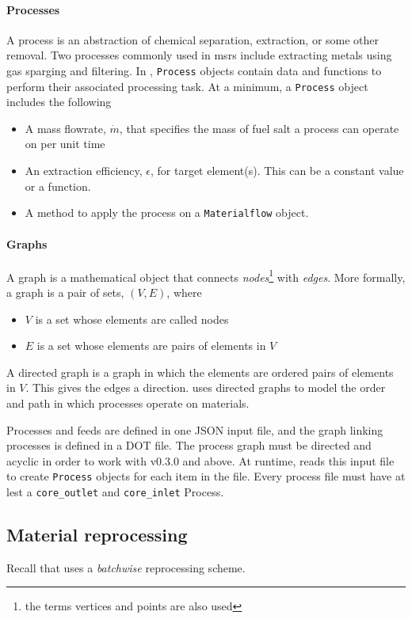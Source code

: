 \paragraph{Processes}
    A process is an abstraction of chemical separation, extraction, or some
    other removal. Two processes commonly used in \Gls{msr}s include
    extracting metals using gas sparging and filtering. In \SaltProc,
    \verb.Process. objects contain data and functions to perform their
    associated processing task. At a minimum, a \verb.Process. object includes
    the following
    \begin{itemize}
        \item A mass flowrate, $\dot{m}$, that specifies the mass of fuel salt a process can operate on per unit time
        \item An extraction efficiency, $\epsilon$, for target element(s). This can be a constant value or a function.
        \item A method to apply the process on a \verb.Materialflow. object. 
    \end{itemize}

\paragraph{Graphs}
    A graph is a mathematical object that connects {\it nodes}\footnote{the
    terms vertices and points are also used} with {\it edges}. More formally,
    a graph is a pair of sets, $(V, E)$, where
    \begin{itemize}
        \item $V$ is a set whose elements are called nodes
        \item $E$ is a set whose elements are pairs of elements in $V$
    \end{itemize}
    A directed graph is a graph in which the elements are ordered pairs of elements
    in $V$. This gives the edges a direction. \SaltProc uses directed graphs to
    model the order and path in which processes operate on materials.
        
Processes and feeds are defined in one JSON input file, and the graph linking
processes is defined in a DOT file. The process graph must be directed and
acyclic in order to work with \SaltProc v0.3.0 and above. At runtime,
\SaltProc reads this input file to create \verb.Process. objects for each item
in the file. Every process file must have at lest a \verb.core_outlet. and
\verb.core_inlet. Process.

\subsection{Material reprocessing}
Recall that \SaltProc uses a {\it batchwise} reprocessing scheme.

